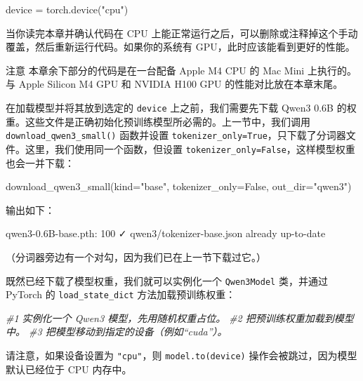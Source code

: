 \begin{codebox}
device = torch.device("cpu")
\end{codebox}

当你读完本章并确认代码在 CPU 上能正常运行之后，可以删除或注释掉这个手动覆盖，然后重新运行代码。如果你的系统有 GPU，此时应该能看到更好的性能。

\begin{myWarning}{注意}
 本章余下部分的代码是在一台配备 Apple M4 CPU 的 Mac Mini 上执行的。与 Apple Silicon M4 GPU 和 NVIDIA H100 GPU 的性能对比放在本章末尾。\end{myWarning}

在加载模型并将其放到选定的 \texttt{device} 上之前，我们需要先下载 Qwen3 0.6B 的权重。这些文件是正确初始化预训练模型所必需的。上一节中，我们调用 \texttt{download\_qwen3\_small()} 函数并设置 \texttt{tokenizer\_only=True}，只下载了分词器文件。这里，我们使用同一个函数，但设置 \texttt{tokenizer\_only=False}，这样模型权重也会一并下载：

\begin{codebox}
download_qwen3_small(kind="base", tokenizer_only=False, out_dir="qwen3")
\end{codebox}

输出如下：

\begin{codebox}
qwen3-0.6B-base.pth: 100%
✓ qwen3/tokenizer-base.json already up-to-date
\end{codebox}

（分词器旁边有一个对勾，因为我们已在上一节下载过它。）

既然已经下载了模型权重，我们就可以实例化一个 \texttt{Qwen3Model} 类，并通过 PyTorch 的 \texttt{load\_state\_dict} 方法加载预训练权重：

{\noindent\small\textit{\#1 实例化一个 Qwen3 模型，先用随机权重占位。 \newline \#2 把预训练权重加载到模型中。 \newline \#3 把模型移动到指定的设备（例如“cuda”）。}\par}

请注意，如果设备设置为 \texttt{"}\texttt{cpu}\texttt{"}，则 \texttt{model.to(device)} 操作会被跳过，因为模型默认已经位于 CPU 内存中。

